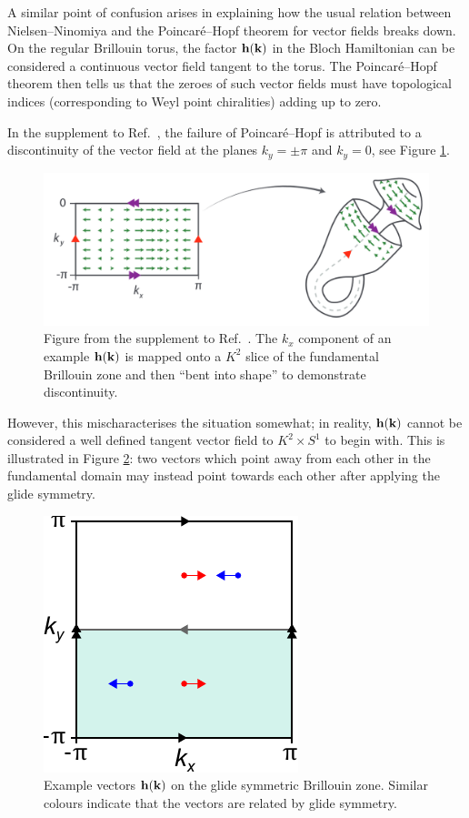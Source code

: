 A similar point of confusion arises in explaining how the usual relation between Nielsen--Ninomiya and the Poincar\'e--Hopf theorem for vector fields breaks down. On the regular Brillouin torus, the factor $\vb{h}(\vb{k})$ in the Bloch Hamiltonian can be considered a continuous vector field tangent to the torus. The Poincar\'e--Hopf theorem then tells us that the zeroes of such vector fields must have topological indices (corresponding to Weyl point chiralities) adding up to zero.

In the supplement to Ref.\ \cite{Fonseca-Vaidya_nonorientable}, the failure of Poincaré--Hopf is attributed to a discontinuity of the vector field at the planes $k_y=\pm\pi$ and $k_y=0$, see Figure \ref{fig:Klein-discontinuity}.
\begin{figure}[htb!]
	\centering
	\includegraphics[width=.8\linewidth]{Images/Klein-discontinuity}
	\caption{Figure from the supplement to Ref.\ \cite{Fonseca-Vaidya_nonorientable}. The $k_x$ component of an example $\vb{h}(\vb{k})$ is mapped onto a $K^2$ slice of the fundamental Brillouin zone and then ``bent into shape'' to demonstrate discontinuity.
	}
	\label{fig:Klein-discontinuity}
\end{figure}
However, this mischaracterises the situation somewhat; in reality, $\vb{h}(\vb{k})$ cannot be considered a well defined tangent vector field to $K^2\times S^1$ to begin with. This is illustrated in Figure \ref{fig:BZ_vectors}: two vectors which point away from each other in the fundamental domain may instead point towards each other after applying the glide symmetry.
\begin{figure}[htb!]
	\centering
	\includegraphics[width=.3\linewidth]{Images/BZ_vectors}
	\caption{Example vectors $\vb{h}(\vb{k})$ on the glide symmetric Brillouin zone. Similar colours indicate that the vectors are related by glide symmetry.}
	\label{fig:BZ_vectors}
\end{figure}
